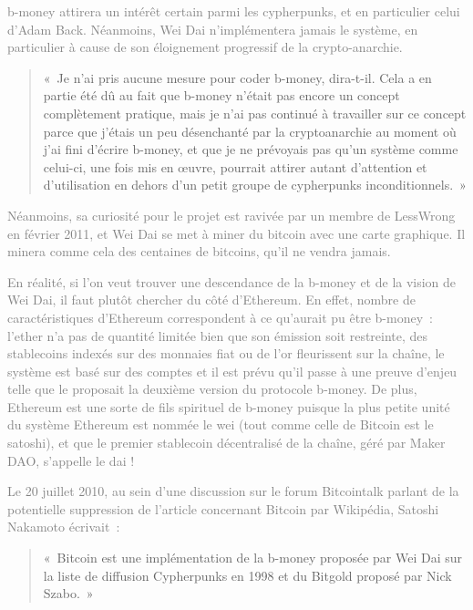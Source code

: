 \textcolor{gray}{b-money attirera un intérêt certain parmi les cypherpunks, et en particulier celui d'Adam Back. Néanmoins, Wei Dai n'implémentera jamais le système, en particulier à cause de son éloignement progressif de la crypto-anarchie.}

\begin{quote}
«~Je n'ai pris aucune mesure pour coder b-money, dira-t-il. Cela a en partie été dû au fait que b-money n'était pas encore un concept complètement pratique, mais je n'ai pas continué à travailler sur ce concept parce que j'étais un peu désenchanté par la cryptoanarchie au moment où j'ai fini d'écrire b-money, et que je ne prévoyais pas qu'un système comme celui-ci, une fois mis en œuvre, pourrait attirer autant d'attention et d'utilisation en dehors d'un petit groupe de cypherpunks inconditionnels.~»
\end{quote}



\textcolor{gray}{Néanmoins, sa curiosité pour le projet est ravivée par un membre de LessWrong en février 2011, et Wei Dai se met à miner du bitcoin avec une carte graphique. Il minera comme cela des centaines de bitcoins, qu'il ne vendra jamais.}

\textcolor{gray}{En réalité, si l'on veut trouver une descendance de la b-money et de la vision de Wei Dai, il faut plutôt chercher du côté d'Ethereum. En effet, nombre de caractéristiques d'Ethereum correspondent à ce qu'aurait pu être b-money~: l'ether n'a pas de quantité limitée bien que son émission soit restreinte, des stablecoins indexés sur des monnaies fiat ou de l'or fleurissent sur la chaîne, le système est basé sur des comptes et il est prévu qu'il passe à une preuve d'enjeu telle que le proposait la deuxième version du protocole b-money. De plus, Ethereum est une sorte de fils spirituel de b-money puisque la plus petite unité du système Ethereum est nommée le wei (tout comme celle de Bitcoin est le satoshi), et que le premier stablecoin décentralisé de la chaîne, géré par Maker DAO, s'appelle le dai !}


\textcolor{gray}{Le 20 juillet 2010, au sein d'une discussion sur le forum Bitcointalk parlant de la potentielle suppression de l'article concernant Bitcoin par Wikipédia, Satoshi Nakamoto écrivait~:}

\begin{quote}
«~Bitcoin est une implémentation de la b-money proposée par Wei Dai sur la liste de diffusion Cypherpunks en 1998 et du Bitgold proposé par Nick Szabo.~»
\end{quote}


